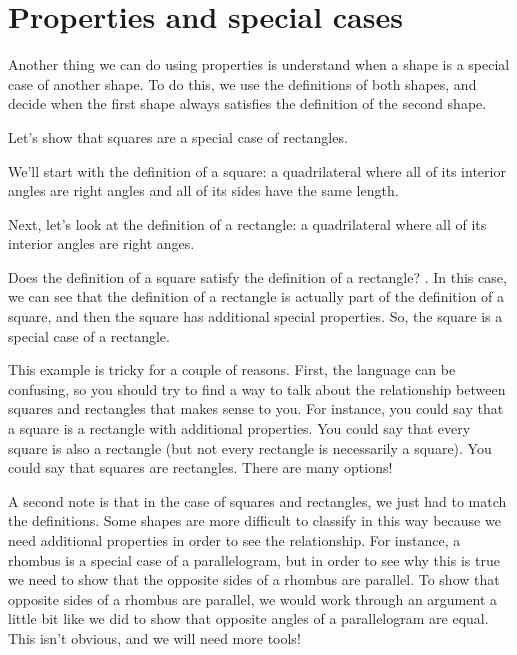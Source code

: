 \documentclass{ximera}
\begin{document}
\section{Properties and special cases}

Another thing we can do using properties is understand when a shape is a special case of another shape. To do 
this, we use the definitions of both shapes, and decide when the first shape always satisfies the definition 
of the second shape.

\begin{example}
	Let's show that squares are a special case of rectangles.
	
	We'll start with the definition of a square: a quadrilateral where all of its interior angles are right 
  angles and all of its sides have the same length.
	
	Next, let's look at the definition of a rectangle: a quadrilateral where all of its interior angles are 
  right anges.
	
	Does the definition of a square satisfy the definition of a rectangle? . 
  In this case, we can see that the definition of a rectangle is actually part of the definition of a square, 
  and then the square has additional special properties. So, the square is a special case of a rectangle.
\end{example}

This example is tricky for a couple of reasons. First, the language can be confusing, so you should try 
to find a way to talk about the relationship between squares and rectangles that makes sense to you. For 
instance, you could say that a square is a rectangle with additional properties. You could say that every 
square is also a rectangle (but not every rectangle is necessarily a square). You could say that squares 
are rectangles. There are many options!

A second note is that in the case of squares and rectangles, we just had to match the definitions. Some shapes 
are more difficult to classify in this way because we need additional properties in order to see the relationship. 
For instance, a rhombus is a special case of a parallelogram, but in order to see why this is true we need to 
show that the opposite sides of a rhombus are parallel. To show that opposite sides of a rhombus are parallel, we 
would work through an argument a little bit like we did to show that opposite angles of a parallelogram are equal.  
This isn't obvious, and we will need more tools!
\end{document}

